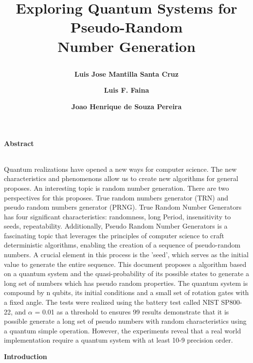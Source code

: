 \documentclass[12pt]{article}
\title{	\raggedright\Large\textbf{Exploring Quantum Systems for Pseudo-Random\\
	Number Generation}}
\author[1,a]{\raggedright\small\textbf{Luis Jose Mantilla Santa Cruz}}
\author[1,b]{\textbf{Luis F. Faina}}
\author[1,c]{\textbf{ Joao Henrique de Souza Pereira}}
\affil[1]{Federal University of Uberlandia, Faculty of Computing, Uberl andia, Minas Gerais, Brazil}
\affil[a]{\textit{luis.santa@ufu.br}}
\affil[b]{\textit{luisfaina@ufu.br}}
\affil[c]{\textit{joaohs@ufu.br}}
\date{}
\begin{document}
	\maketitle
	{\raggedright\large\textbf{Abstract}}\\
	
	{Quantum realizations have opened a new ways for computer science. The new characteristics and phenomenons allow us to
	create new algorithms for general proposes. An interesting topic is random number generation. There are two perspectives for
	this proposes. True random numbers generator (TRN) and pseudo random numbers generator (PRNG). True Random Number
	Generators has four significant characteristics: randomness, long Period, insensitivity to seeds, repeatability. Additionally,
	Pseudo Random Number Generators is a fascinating topic that leverages the principles of computer science to craft deterministic
	algorithms, enabling the creation of a sequence of pseudo-random numbers. A crucial element in this process is the ’seed’,
	which serves as the initial value to generate the entire sequence. This document proposes a algorithm based on a quantum
	system and the quasi-probability of its possible states to generate a long set of numbers which has pseudo random properties.
	The quantum system is compound by n qubits, its initial conditions and a small set of rotation gates with a fixed angle. The
	tests were realized using the battery test called NIST SP800-22, and $\alpha$ = 0.01 as a threshold to ensures 99%
	results demonstrate that it is possible generate a long set of pseudo numbers with random characteristics using a quantum
	simple operation. However, the experiments reveal that a real world implementation require a quantum system with at least
	10-9 precision order.}\\
	
	{\raggedright\large\textbf{Introduction}}\\
	
\end{document}
